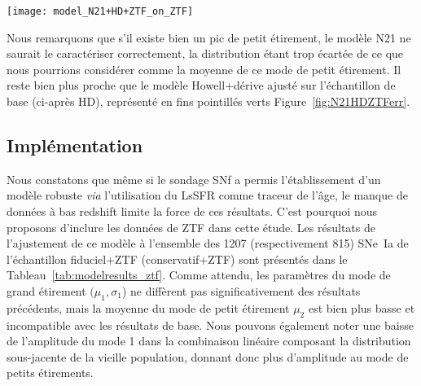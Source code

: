 \documentclass[../main/main.tex]{subfiles}
\begin{document}
\begin{SCfigure}[1][ht]
    \texttt{[image: model\_N21+HD+ZTF\_on\_ZTF]}
    \caption[Accord entre les modèles N21+ZTF et HD+ZTF et l'histogramme des
    étirements de ZTF]{En violet~: histogramme des étirements de ZTF. En
        bleu (violet) et leurs bandes~: modèles de base ajustés sur
        l'échantillon de base, N21, (échantillon avec ZTF, N21+ZTF) au
        redshift moyen de ZTF et leur erreur. En fin pointillés verts (ligne
        continue)~: modèles Howell+dérive ajustés sur l'échantillon de base,
    HD (échantillon avec ZTF, HD+ZTF).}
    \label{fig:N21HDZTFerr}
\end{SCfigure}

Nous remarquons que s'il existe bien un pic de petit étirement, le modèle N21 ne
saurait le caractériser correctement, la distribution étant trop écartée de ce
que nous pourrions considérer comme la moyenne de ce mode de petit étirement. Il
reste bien plus proche que le modèle Howell+dérive ajusté sur l'échantillon de
base (ci-après HD), représenté en fins pointillés verts
Figure~\ref{fig:N21HDZTFerr}.

\subsection{Implémentation}\label{ssec:xamel}

Nous constatons que même si le sondage SNf a permis l'établissement d'un modèle
robuste \textit{via} l'utilisation du LsSFR comme traceur de l'âge, le manque de
données à bas redshift limite la force de ces résultats. C'est pourquoi nous
proposons d'inclure les données de ZTF dans cette étude. Les résultats de
l'ajustement de ce modèle à l'ensemble des 1207 (respectivement 815) SNe~Ia de
l'échantillon fiduciel+ZTF (conservatif+ZTF) sont présentés dans le
Tableau~\ref{tab:modelresults_ztf}. Comme attendu, les paramètres du mode de
grand étirement $(\mu_1,\sigma_1$) ne diffèrent pas significativement des
résultats précédents, mais la moyenne du mode de petit étirement $\mu_2$ est
bien plus basse et incompatible avec les résultats de base. Nous pouvons
également noter une baisse de l'amplitude du mode 1 dans la combinaison linéaire
composant la distribution sous-jacente de la vieille population, donnant donc
plus d'amplitude au mode de petits étirements.
\end{document}

